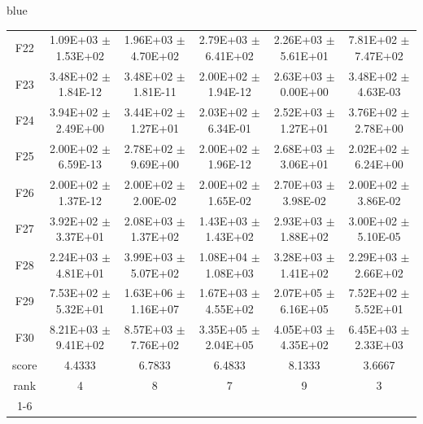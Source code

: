 \documentclass[journal, onecolumn]{IEEEtran}
\begin{document}
\begin{color}{blue}
\begin{table}[htbp!]
\begin{tabular}{c|ccccc}
			F22	 &	1.09E+03	$\pm$	1.53E+02		 &	1.96E+03	$\pm$	4.70E+02		 &	2.79E+03	$\pm$	6.41E+02		 &	2.26E+03	$\pm$	5.61E+01		 &	7.81E+02	$\pm$	7.47E+02	\\	
			F23	 &	3.48E+02	$\pm$	1.84E-12		 &	3.48E+02	$\pm$	1.81E-11		 &	2.00E+02	$\pm$	1.94E-12		 &	2.63E+03	$\pm$	0.00E+00		 &	3.48E+02	$\pm$	4.63E-03	\\	
			F24	 &	3.94E+02	$\pm$	2.49E+00		 &	3.44E+02	$\pm$	1.27E+01		 &	2.03E+02	$\pm$	6.34E-01		 &	2.52E+03	$\pm$	1.27E+01		 &	3.76E+02	$\pm$	2.78E+00	\\	
			F25	 &	2.00E+02	$\pm$	6.59E-13		 &	2.78E+02	$\pm$	9.69E+00		 &	2.00E+02	$\pm$	1.96E-12		 &	2.68E+03	$\pm$	3.06E+01		 &	2.02E+02	$\pm$	6.24E+00	\\	
			F26	 &	2.00E+02	$\pm$	1.37E-12		 &	2.00E+02	$\pm$	2.00E-02		 &	2.00E+02	$\pm$	1.65E-02		 &	2.70E+03	$\pm$	3.98E-02		 &	2.00E+02	$\pm$	3.86E-02	\\	
			F27	 &	3.92E+02	$\pm$	3.37E+01		 &	2.08E+03	$\pm$	1.37E+02		 &	1.43E+03	$\pm$	1.43E+02		 &	2.93E+03	$\pm$	1.88E+02		 &	3.00E+02	$\pm$	5.10E-05	\\	
			F28	 &	2.24E+03	$\pm$	4.81E+01		 &	3.99E+03	$\pm$	5.07E+02		 &	1.08E+04	$\pm$	1.08E+03		 &	3.28E+03	$\pm$	1.41E+02		 &	2.29E+03	$\pm$	2.66E+02	\\	
			F29	 &	7.53E+02	$\pm$	5.32E+01		 &	1.63E+06	$\pm$	1.16E+07		 &	1.67E+03	$\pm$	4.55E+02		 &	2.07E+05	$\pm$	6.16E+05		 &	7.52E+02	$\pm$	5.52E+01	\\	
			F30	 &	8.21E+03	$\pm$	9.41E+02		 &	8.57E+03	$\pm$	7.76E+02		 &	3.35E+05	$\pm$	2.04E+05		 &	4.05E+03	$\pm$	4.35E+02		 &	6.45E+03	$\pm$	2.33E+03	\\	\hline
			score	 	& 4.4333 & 6.7833 & 6.4833 & 8.1333 & 3.6667											\\													
			rank 		 & 4 & 8 & 7 & 9 & 3											\\	\cline{1-6}												
			

\end{tabular}
\end{table}
\end{color}
\end{document}
